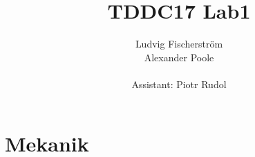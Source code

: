\documentclass[a4paper,12pt]{article}
\title{TDDC17 Lab1}
\author{Ludvig Fischerstr\"{o}m \\Alexander Poole\\ \\Assistant: Piotr Rudol}
\begin{document}
\section{Mekanik}
\end{document}
